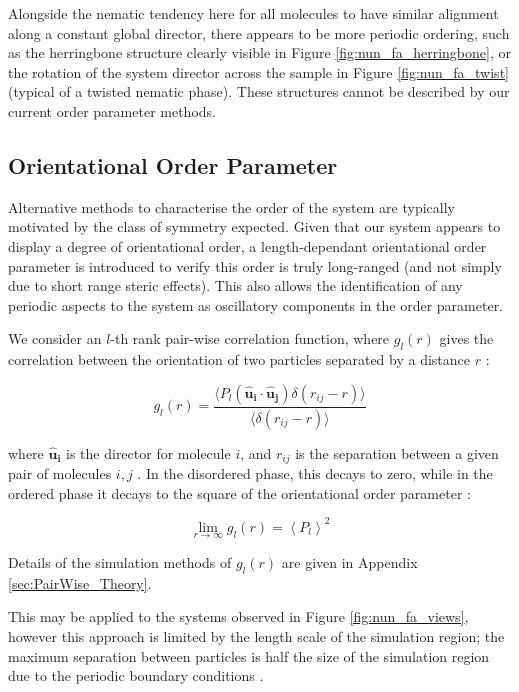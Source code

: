 \documentclass[11pt, a4paper]{article} %
\begin{document}
Alongside the nematic tendency here for all molecules to have similar alignment along a constant global director, there appears to be more periodic ordering, such as the herringbone structure clearly visible in Figure \ref{fig:nun_fa_herringbone}, or the rotation of the system director across the sample in Figure \ref{fig:nun_fa_twist} (typical of a twisted nematic phase). These structures cannot be described by our current order parameter methods.


\subsection{Orientational Order Parameter} \label{sec:PairWise_Application}
Alternative methods to characterise the order of the system are typically motivated by the class of symmetry expected. Given that our system appears to display a degree of orientational order, a length-dependant orientational order parameter is introduced to verify this order is truly long-ranged (and not simply due to short range steric effects). This also allows the identification of any periodic aspects to the system as oscillatory components in the order parameter.

We consider an $l$-th rank pair-wise correlation function, where $g_{l}(r)$ gives the correlation between the orientation of two particles separated by a distance $r$ :

\begin{equation} \label{eq:PairWise_eq}
g_{l}(r) = \frac{\langle P_{l}(\boldsymbol{\hat{u}_{i}}\cdot \boldsymbol{\hat{u}_{j}}) \delta(r_{ij}-r)\rangle}{\langle  \delta(r_{ij}-r) \rangle}
\end{equation}

where $\boldsymbol{\hat{u}_{i}}$ is the director for molecule $i$, and $r_{ij}$ is the separation between a given pair of molecules $i,j$ \cite{Zannoni1979}. In the disordered phase, this decays to zero, while in the ordered phase it decays to the square of the orientational order parameter \cite{Frenkel1985b}:

\begin{equation}
\lim_{r \to \infty}g_{l}(r) = \left\langle P_{l} \right\rangle ^{2}
\end{equation}

Details of the simulation methods of $g_{l}(r)$ are given in Appendix \ref{sec:PairWise_Theory}. 

This may be applied to the systems observed in Figure \ref{fig:nun_fa_views}, however this approach is limited by the length scale of the simulation region; the maximum separation between particles is half the size of the simulation region due to the periodic boundary conditions \cite{Frenkel1985c}.
\end{document}

